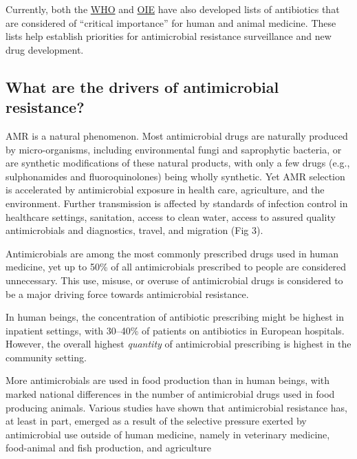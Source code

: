 \documentclass[]{tufte-handout}
\begin{document}
Currently, both the
\href{https://apps.who.int/iris/bitstream/handle/10665/312266/9789241515528-eng.pdf}{WHO}
and
\href{https://www.oie.int/en/what-we-do/global-initiatives/antimicrobial-resistance/\#ui-id-4}{OIE}
have also developed lists of antibiotics that are considered of
``critical importance'' for human and animal medicine. These lists help
establish priorities for antimicrobial resistance surveillance and new
drug development.

\hypertarget{what-are-the-drivers-of-antimicrobial-resistance}{%
\subsection*{What are the drivers of antimicrobial
resistance?}\label{what-are-the-drivers-of-antimicrobial-resistance}}

AMR is a natural phenomenon. Most antimicrobial drugs are naturally
produced by micro-organisms, including environmental fungi and
saprophytic bacteria, or are synthetic modifications of these natural
products, with only a few drugs (e.g., sulphonamides and
fluoroquinolones) being wholly synthetic. Yet AMR selection is
accelerated by antimicrobial exposure in health care, agriculture, and
the environment. Further transmission is affected by standards of
infection control in healthcare settings, sanitation, access to clean
water, access to assured quality antimicrobials and diagnostics, travel,
and migration (Fig 3).

Antimicrobials are among the most commonly prescribed drugs used in
human medicine, yet up to 50\% of all antimicrobials prescribed to
people are considered unnecessary. This use, misuse, or overuse of
antimicrobial drugs is considered to be a major driving force towards
antimicrobial resistance.

In human beings, the concentration of antibiotic prescribing might be
highest in inpatient settings, with 30--40\% of patients on antibiotics
in European hospitals. However, the overall highest \emph{quantity} of
antimicrobial prescribing is highest in the community setting.

More antimicrobials are used in food production than in human beings,
with marked national differences in the number of antimicrobial drugs
used in food producing animals. Various studies have shown that
antimicrobial resistance has, at least in part, emerged as a result of
the selective pressure exerted by antimicrobial use outside of human
medicine, namely in veterinary medicine, food-animal and fish
production, and agriculture
\end{document}
